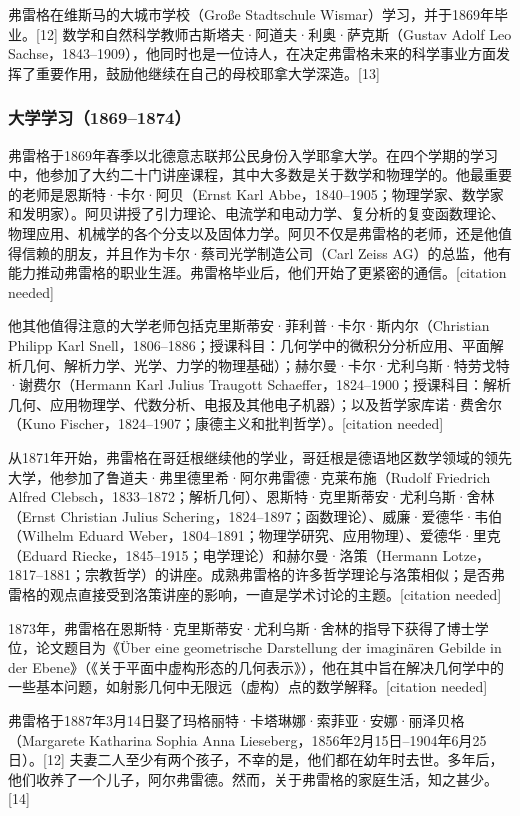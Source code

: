 弗雷格在维斯马的大城市学校（Große Stadtschule Wismar）学习，并于1869年毕业。[12] 数学和自然科学教师古斯塔夫·阿道夫·利奥·萨克斯（Gustav Adolf Leo Sachse，1843–1909），他同时也是一位诗人，在决定弗雷格未来的科学事业方面发挥了重要作用，鼓励他继续在自己的母校耶拿大学深造。[13]
\subsubsection{大学学习（1869–1874）}  
弗雷格于1869年春季以北德意志联邦公民身份入学耶拿大学。在四个学期的学习中，他参加了大约二十门讲座课程，其中大多数是关于数学和物理学的。他最重要的老师是恩斯特·卡尔·阿贝（Ernst Karl Abbe，1840–1905；物理学家、数学家和发明家）。阿贝讲授了引力理论、电流学和电动力学、复分析的复变函数理论、物理应用、机械学的各个分支以及固体力学。阿贝不仅是弗雷格的老师，还是他值得信赖的朋友，并且作为卡尔·蔡司光学制造公司（Carl Zeiss AG）的总监，他有能力推动弗雷格的职业生涯。弗雷格毕业后，他们开始了更紧密的通信。[citation needed]

他其他值得注意的大学老师包括克里斯蒂安·菲利普·卡尔·斯内尔（Christian Philipp Karl Snell，1806–1886；授课科目：几何学中的微积分分析应用、平面解析几何、解析力学、光学、力学的物理基础）；赫尔曼·卡尔·尤利乌斯·特劳戈特·谢费尔（Hermann Karl Julius Traugott Schaeffer，1824–1900；授课科目：解析几何、应用物理学、代数分析、电报及其他电子机器）；以及哲学家库诺·费舍尔（Kuno Fischer，1824–1907；康德主义和批判哲学）。[citation needed]

从1871年开始，弗雷格在哥廷根继续他的学业，哥廷根是德语地区数学领域的领先大学，他参加了鲁道夫·弗里德里希·阿尔弗雷德·克莱布施（Rudolf Friedrich Alfred Clebsch，1833–1872；解析几何）、恩斯特·克里斯蒂安·尤利乌斯·舍林（Ernst Christian Julius Schering，1824–1897；函数理论）、威廉·爱德华·韦伯（Wilhelm Eduard Weber，1804–1891；物理学研究、应用物理）、爱德华·里克（Eduard Riecke，1845–1915；电学理论）和赫尔曼·洛策（Hermann Lotze，1817–1881；宗教哲学）的讲座。成熟弗雷格的许多哲学理论与洛策相似；是否弗雷格的观点直接受到洛策讲座的影响，一直是学术讨论的主题。[citation needed]

1873年，弗雷格在恩斯特·克里斯蒂安·尤利乌斯·舍林的指导下获得了博士学位，论文题目为《Über eine geometrische Darstellung der imaginären Gebilde in der Ebene》（《关于平面中虚构形态的几何表示》），他在其中旨在解决几何学中的一些基本问题，如射影几何中无限远（虚构）点的数学解释。[citation needed]

弗雷格于1887年3月14日娶了玛格丽特·卡塔琳娜·索菲亚·安娜·丽泽贝格（Margarete Katharina Sophia Anna Lieseberg，1856年2月15日–1904年6月25日）。[12] 夫妻二人至少有两个孩子，不幸的是，他们都在幼年时去世。多年后，他们收养了一个儿子，阿尔弗雷德。然而，关于弗雷格的家庭生活，知之甚少。[14]
